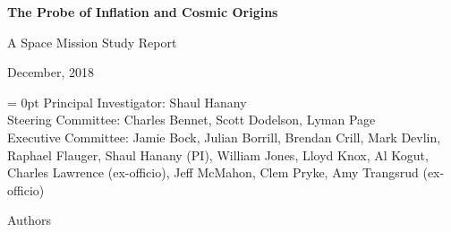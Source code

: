 \documentclass[PICOReport.tex]{subfiles}
\begin{document}

\LARGE{ \centerline{\bf{The Probe of Inflation and Cosmic Origins}}}
\vspace{0.4in}
\Large{ \centerline{A Space Mission Study Report}}
\Large{ \centerline{December, 2018 }}
\vspace{0.4in}
\parindent = 0pt
\normalsize{Principal Investigator: Shaul Hanany} \\
\normalsize{Steering Committee: Charles Bennet, Scott Dodelson, Lyman Page } \\
\normalsize{Executive Committee:  Jamie Bock, Julian Borrill, Brendan Crill, Mark Devlin, Raphael Flauger, Shaul Hanany (PI), William Jones, Lloyd Knox, Al Kogut, Charles Lawrence (ex-officio), Jeff McMahon, Clem Pryke, Amy Trangsrud (ex-officio)} \\

\Large  {\centerline {Authors}}
\end{document}
